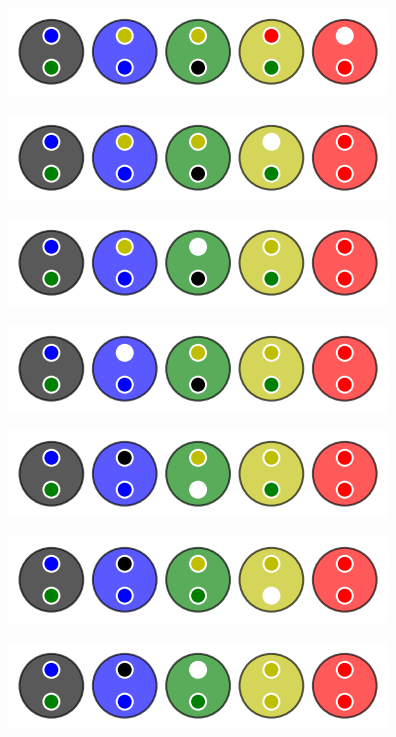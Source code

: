 \begin{multicols}{2}
\begin{center}
        \includegraphics[scale= 0.45]{content/algo_selection/example/007.png}
    \end{center}

    \columnbreak
    \begin{center}
        \includegraphics[scale= 0.45]{content/algo_selection/example/008.png}

        \includegraphics[scale= 0.45]{content/algo_selection/example/009.png}

        \includegraphics[scale= 0.45]{content/algo_selection/example/010.png}

        \includegraphics[scale= 0.45]{content/algo_selection/example/011.png}

        \includegraphics[scale= 0.45]{content/algo_selection/example/012.png}

        \includegraphics[scale= 0.45]{content/algo_selection/example/013.png}


\end{center}
\end{multicols}
